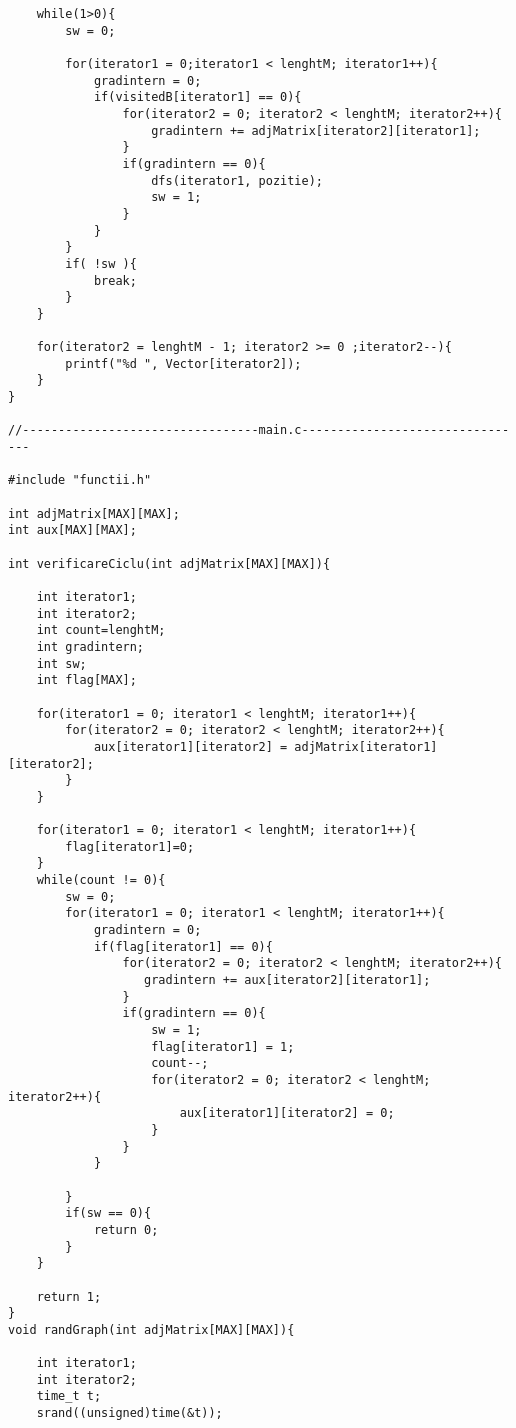 \documentclass[14pt]{article}
\begin{document}
\begin{lstlisting}
    while(1>0){
        sw = 0;

        for(iterator1 = 0;iterator1 < lenghtM; iterator1++){
            gradintern = 0;
            if(visitedB[iterator1] == 0){
                for(iterator2 = 0; iterator2 < lenghtM; iterator2++){
                    gradintern += adjMatrix[iterator2][iterator1];
                }
                if(gradintern == 0){
                    dfs(iterator1, pozitie);
                    sw = 1;
                }
            }
        }
        if( !sw ){
            break;
        }
    }

    for(iterator2 = lenghtM - 1; iterator2 >= 0 ;iterator2--){
        printf("%d ", Vector[iterator2]);
    }
}

//---------------------------------main.c--------------------------------

#include "functii.h"

int adjMatrix[MAX][MAX];
int aux[MAX][MAX];

int verificareCiclu(int adjMatrix[MAX][MAX]){

    int iterator1;
    int iterator2;
    int count=lenghtM;
    int gradintern;
    int sw;
    int flag[MAX];

    for(iterator1 = 0; iterator1 < lenghtM; iterator1++){
        for(iterator2 = 0; iterator2 < lenghtM; iterator2++){
            aux[iterator1][iterator2] = adjMatrix[iterator1][iterator2];
        }
    }

    for(iterator1 = 0; iterator1 < lenghtM; iterator1++){
        flag[iterator1]=0;
    }
    while(count != 0){
        sw = 0;
        for(iterator1 = 0; iterator1 < lenghtM; iterator1++){
            gradintern = 0;
            if(flag[iterator1] == 0){
                for(iterator2 = 0; iterator2 < lenghtM; iterator2++){
                   gradintern += aux[iterator2][iterator1];
                }
                if(gradintern == 0){
                    sw = 1;
                    flag[iterator1] = 1;
                    count--;
                    for(iterator2 = 0; iterator2 < lenghtM; iterator2++){
                        aux[iterator1][iterator2] = 0;
                    }
                }
            }

        }
        if(sw == 0){
            return 0;
        }
    }

    return 1;
}
void randGraph(int adjMatrix[MAX][MAX]){

    int iterator1;
    int iterator2;
    time_t t;
    srand((unsigned)time(&t));


\end{lstlisting}
\end{document}
